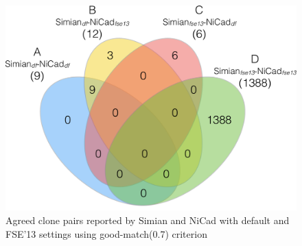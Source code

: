 \documentclass{IEEEtran}
\begin{document}

\begin{figure}[H]
	\centering
	\includegraphics[width=0.5\linewidth]{venn4_pairs_good}
	\caption[Agreed clone pairs reported by Simian and NiCad with default and FSE'13 settings using good-match(0.7) criterion]{Agreed clone pairs reported by Simian and NiCad with default and FSE'13 settings using good-match(0.7) criterion}
	\label{fig:venn4_pairs}
\end{figure}
\end{document}
